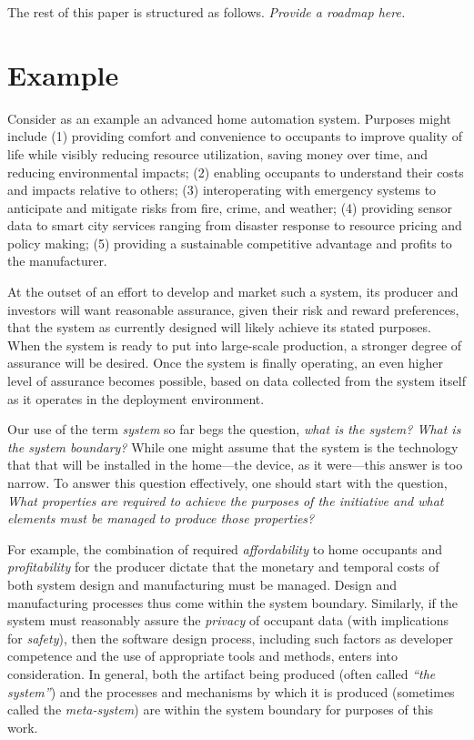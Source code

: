 \documentclass[conference]{IEEEtran}
\begin{document}
The rest of this paper is structured as follows. {\em Provide a roadmap here.}


\section{Example}
Consider as an example an advanced home automation system. Purposes might include (1) providing comfort and convenience to occupants to improve quality of life while visibly reducing resource utilization, saving money over time, and reducing environmental impacts; (2) enabling occupants to understand their costs and impacts relative to others; (3) interoperating with emergency systems to anticipate and mitigate risks from fire, crime, and weather; (4) providing sensor data to smart city services ranging from disaster response to resource pricing and policy making; (5) providing a sustainable competitive advantage and profits to the manufacturer.

At the outset of an effort to develop and market such a system, its producer and investors will want reasonable assurance, given their risk and reward preferences, that the system as currently designed will likely achieve its stated purposes. When the system is ready to put into large-scale production, a stronger degree of assurance will be desired. Once the system is finally operating, an even higher level of assurance becomes possible, based on data collected from the system itself as it operates in the deployment environment.

Our use of the term {\em system} so far begs the question, {\em what is the system? What is the system boundary?} While one might assume that the system is the technology that that will be installed in the home---the device, as it were---this answer is too narrow. To answer this question effectively, one should start with the question, {\em What properties are required to achieve the purposes of the initiative and what elements must be managed to produce those properties?} 

For example, the combination of required {\em affordability} to home occupants and {\em profitability} for the producer dictate that the monetary and temporal costs of both system design and manufacturing must be managed. Design and manufacturing processes thus come within the system boundary. Similarly, if the system must reasonably assure the {\em privacy} of occupant data (with implications for {\em safety}), then the software design process, including such factors as developer competence and the use of appropriate tools and methods, enters into consideration. In general, both the artifact being produced (often called {\em ``the system''}) and the processes and mechanisms by which it is produced (sometimes called the {\em meta-system}) are within the system boundary for purposes of this work.
\end{document}
